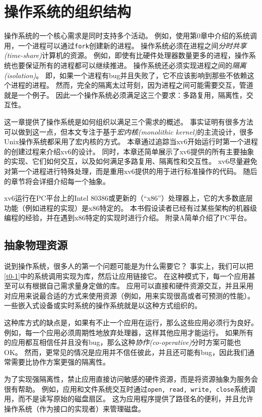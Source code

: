 \chapter{操作系统的组织结构}

操作系统的一个核心需求是同时支持多个活动。
例如，使用第0章中介绍的系统调用，一个进程可以通过\texttt{fork}创建新的进程。
操作系统必须在进程之间\emph{分时共享(time-share)}计算机的资源。
例如，即使有比硬件处理器数量更多的进程，操作系统也要保证所有的进程都可以继续推进。
操作系统还必须实现进程之间的\emph{隔离(isolation)}。
即，如果一个进程有bug并且失败了，它不应该影响到那些不依赖这个进程的进程。
然而，完全的隔离太过苛刻，因为进程之间可能需要交互，管道就是一个例子。
因此一个操作系统必须满足这三个要求：多路复用，隔离性，交互性。

这一章提供了操作系统是如何组织以满足三个需求的概述。
事实证明有很多方法可以做到这一点，但本文专注于基于\emph{宏内核(monolithic kernel)}的主流设计，很多Unix操作系统都采用了宏内核的方式。
本章通过追踪当xv6开始运行时第一个进程的创建过程来介绍xv6的设计。
同时，本章还简单展示了xv6提供的所有主要抽象的实现、它们如何交互，以及如何满足多路复用、隔离性和交互性。
xv6尽量避免对第一个进程进行特殊处理，而是重用xv6提供的用于进行标准操作的代码。
随后的章节将会详细介绍每一个抽象。

xv6运行在PC平台上的Intel 80386或更新的（“x86”）处理器上，它的大多数底层功能（例如进程的实现）是x86特定的。
本书假设读者已经有过某些架构的机器级编程的经验，并在遇到x86特定的实现时进行介绍。
附录A简单介绍了PC平台。

\section*{抽象物理资源}
说到操作系统，很多人的第一个问题可能是为什么需要它？
事实上，我们可以把\autoref{t0-1}中的系统调用实现为库，然后让应用链接它。
在这种模式下，每一个应用甚至可以有根据自己需求量身定做的库。
应用可以直接和硬件资源交互，并且采用对应用来说最合适的方式来使用资源（例如，用来实现很高或者可预测的性能）。
一些嵌入式设备或实时系统的操作系统就是以这种方式组织的。

这种库方式的缺点是，如果有不止一个应用在运行，那么这些应用必须行为良好。
例如，每一个应用必须周期性地放弃处理器，这样其他应用才能运行。
如果所有的应用都互相信任并且没有bug，那么这种\emph{协作(co-operative)}分时方案可能也OK。
然而，更常见的情况是应用并不信任彼此，并且还可能有bug，因此我们通常需要比协作方案更强的隔离性。

为了实现强隔离性，禁止应用直接访问敏感的硬件资源，而是将资源抽象为服务会很有帮助。
例如，应用和文件系统交互时通过\texttt{open, read, write, close}系统调用，而不是读写原始的磁盘扇区。
这为应用程序提供了路径名的便利，并且允许操作系统（作为接口的实现者）来管理磁盘。

